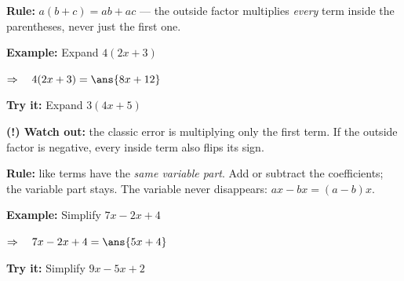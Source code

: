 \documentclass[12pt]{article}
\begin{document}


\begin{formulabox}
\textbf{Rule:} \quad $a(b + c) = ab + ac$ \quad --- the outside factor multiplies
\emph{every} term inside the parentheses, never just the first one.
\end{formulabox}

\begin{examplebox}
\textbf{Example:} \quad Expand $4(2x + 3)$

$\Rightarrow\quad 4(2x + 3) = \ans{8x + 12}$
\end{examplebox}

\begin{tryitbox}
\textbf{Try it:} \quad Expand $3(4x + 5)$\\[2pt]
\end{tryitbox}

\begin{watchoutbox}
\textbf{(!) Watch out:} the classic error is multiplying only the first term.
If the outside factor is negative, every inside term also flips its sign.
\end{watchoutbox}


\begin{formulabox}
\textbf{Rule:} like terms have the \emph{same variable part}. Add or subtract the
coefficients; the variable part stays. The variable never disappears:
$ax - bx = (a - b)x$.
\end{formulabox}

\begin{examplebox}
\textbf{Example:} \quad Simplify $7x - 2x + 4$

$\Rightarrow\quad 7x - 2x + 4 = \ans{5x + 4}$
\end{examplebox}

\begin{tryitbox}
\textbf{Try it:} \quad Simplify $9x - 5x + 2$\\[2pt]
\end{tryitbox}
\end{document}
